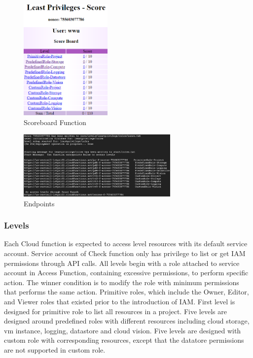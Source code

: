 \documentclass[sigconf]{acmart}
\begin{document}
\begin{figure}[h]
  \centering
  \includegraphics[width=0.4\textwidth]{pic/score}
  \caption {Scoreboard Function}
  \label{fig:score}
\end{figure}

\begin{figure}[h]
  \centering
  \includegraphics[width=0.7\textwidth]{pic/endpoints}
  \caption {Endpoints}
   \label{fig:endpoints}
\end{figure}
\subsubsection{Levels}
Each Cloud function is expected to access level resources with its default service account. Service account of Check function only has privilege to list or get IAM permissions through API calls. All levels begin with a role attached to service account in Access Function,  containing excessive permissions,  to perform specific action. The winner condition is to modify the role with minimum permissions that performs the same action. 
Primitive roles, which include the Owner, Editor, and Viewer roles that existed prior to the introduction of IAM.
First level is designed for primitive role to list all resources in a project. Five levels are designed around predefined roles with different resources including cloud storage, vm instance, logging, datastore and cloud vision. Five levels are designed with custom role with corresponding resources, except that the datatore permissions are not supported in custom role.
\end{document}
